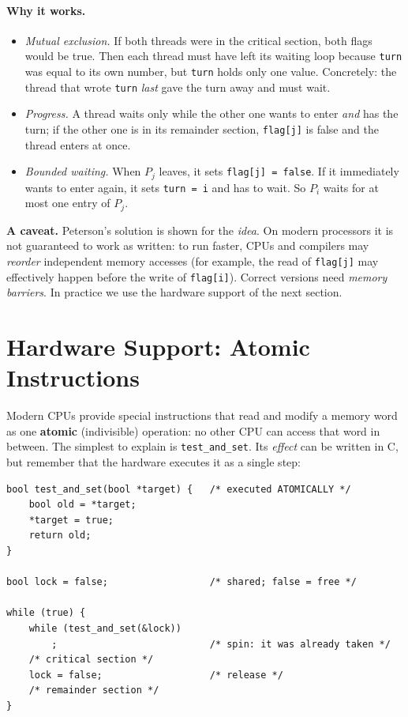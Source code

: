 \documentclass[11pt,a4paper]{article}
\newcommand{\term}[1]{\textbf{\color{mintdeep}#1}}
\begin{document}
\paragraph{Why it works.}
\begin{itemize}
  \item \emph{Mutual exclusion.} If both threads were in the critical section, both flags would be true. Then each thread must have left its waiting loop because \texttt{turn} was equal to its own number, but \texttt{turn} holds only one value. Concretely: the thread that wrote \texttt{turn} \emph{last} gave the turn away and must wait.
  \item \emph{Progress.} A thread waits only while the other one wants to enter \emph{and} has the turn; if the other one is in its remainder section, \texttt{flag[j]} is false and the thread enters at once.
  \item \emph{Bounded waiting.} When $P_j$ leaves, it sets \texttt{flag[j] = false}. If it immediately wants to enter again, it sets \texttt{turn = i} and has to wait. So $P_i$ waits for at most one entry of $P_j$.
\end{itemize}

\textbf{A caveat.} Peterson's solution is shown for the \emph{idea}. On modern processors it is not guaranteed to work as written: to run faster, CPUs and compilers may \emph{reorder} independent memory accesses (for example, the read of \texttt{flag[j]} may effectively happen before the write of \texttt{flag[i]}). Correct versions need \emph{memory barriers}. In practice we use the hardware support of the next section.

\section{Hardware Support: Atomic Instructions}

Modern CPUs provide special instructions that read and modify a memory word as one \term{atomic} (indivisible) operation: no other CPU can access that word in between. The simplest to explain is \texttt{test\_and\_set}. Its \emph{effect} can be written in C, but remember that the hardware executes it as a single step:

\begin{lstlisting}
bool test_and_set(bool *target) {   /* executed ATOMICALLY */
    bool old = *target;
    *target = true;
    return old;
}

bool lock = false;                  /* shared; false = free */

while (true) {
    while (test_and_set(&lock))
        ;                           /* spin: it was already taken */
    /* critical section */
    lock = false;                   /* release */
    /* remainder section */
}
\end{lstlisting}
\end{document}
